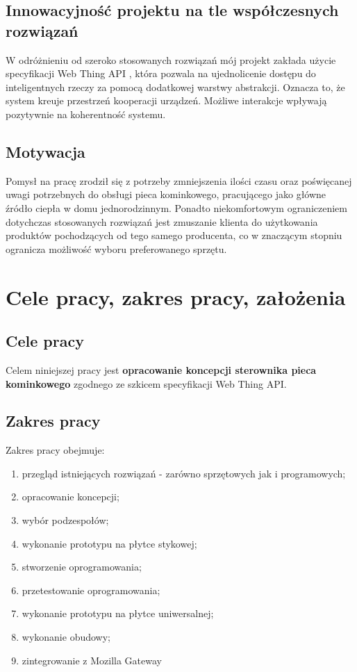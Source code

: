\documentclass[11pt]{report}
\begin{document}
 \section{Innowacyjność projektu na tle współczesnych rozwiązań}
 W odróżnieniu od szeroko stosowanych rozwiązań mój projekt zakłada użycie specyfikacji Web Thing API \cite{WebThing2020}, która pozwala na ujednolicenie dostępu do inteligentnych rzeczy za pomocą dodatkowej warstwy abstrakcji. Oznacza to, że system kreuje przestrzeń kooperacji urządzeń. Możliwe interakcje wpływają pozytywnie na koherentność systemu.
 
 \section{Motywacja}
Pomysł na pracę zrodził się z potrzeby zmniejszenia ilości czasu oraz poświęcanej uwagi potrzebnych do obsługi pieca kominkowego, pracującego jako główne źródło ciepła w domu jednorodzinnym. Ponadto niekomfortowym ograniczeniem dotychczas stosowanych rozwiązań jest zmuszanie klienta do użytkowania produktów pochodzących od tego samego producenta, co w znaczącym stopniu ogranicza możliwość wyboru preferowanego sprzętu.


 \chapter{Cele pracy, zakres pracy, założenia}\label{ch:cele}

 \section{Cele pracy}
 Celem niniejszej pracy jest \textbf{opracowanie koncepcji sterownika pieca kominkowego} zgodnego ze szkicem specyfikacji Web Thing API.

 \section{Zakres pracy}
 Zakres pracy obejmuje:
 \begin{enumerate}
 \item przegląd istniejących rozwiązań - zarówno sprzętowych jak i programowych;
 \item opracowanie koncepcji;
 \item wybór podzespołów;
 \item wykonanie prototypu na płytce stykowej;
 \item stworzenie oprogramowania;
 \item przetestowanie oprogramowania; 
 \item wykonanie prototypu na płytce uniwersalnej;
 \item wykonanie obudowy;
 \item zintegrowanie z Mozilla Gateway
 \end{enumerate}
 
\end{document}
